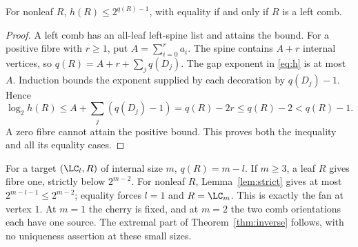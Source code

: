 \begin{lemma}\label{lem:strict}
For nonleaf \(R\), \(h(R)\le 2^{q(R)-1}\), with equality if and only if
\(R\) is a left comb.
\end{lemma}

\begin{proof}
A left comb has an all-leaf left-spine list and attains the bound.
For a positive fibre with \(r\ge1\), put \(A=\sum_{i=0}^r a_i\).
The spine contains \(A+r\) internal vertices, so
\(q(R)=A+r+\sum_jq(D_j)\).
The gap exponent in \eqref{eq:h} is at most \(A\).
Induction bounds the exponent supplied by each decoration by \(q(D_j)-1\).
Hence
\[
 \log_2h(R)\le A+\sum_j(q(D_j)-1)
             =q(R)-2r\le q(R)-2<q(R)-1.
\]
A zero fibre cannot attain the positive bound. This proves both the
inequality and all its equality cases.
\end{proof}

For a target \((\LC_l,R)\) of internal size \(m\), \(q(R)=m-l\).
If \(m\ge3\), a leaf \(R\) gives fibre one, strictly below \(2^{m-2}\).
For nonleaf \(R\), Lemma~\ref{lem:strict} gives at most
\(2^{m-l-1}\le2^{m-2}\); equality forces \(l=1\) and
\(R=\LC_m\). This is exactly the fan at vertex \(1\).
At \(m=1\) the cherry is fixed, and at \(m=2\) the two comb orientations
each have one source. The extremal part of Theorem~\ref{thm:inverse}
follows, with no uniqueness assertion at these small sizes.
